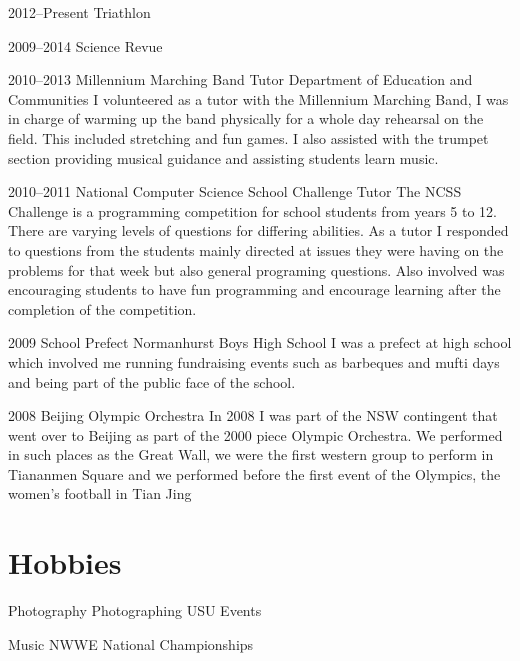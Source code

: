 \documentclass[]{friggeri-cv} %
\begin{document}
\begin{entrylist}


\entry
{2012--Present}
{Triathlon}
{}
{
}

\entry
{2009--2014}
{Science Revue}
{}
{
}

\entry
{2010--2013}
{Millennium Marching Band Tutor}
{Department of Education and Communities}
{I volunteered as a tutor with the Millennium Marching Band, I was in charge of warming up the band physically for a whole day rehearsal on the field. This included stretching and fun games. I also assisted with the trumpet section providing musical guidance and assisting students learn music.}

\entry
{2010--2011}
{National Computer Science School Challenge Tutor}
{}
{The NCSS Challenge is a programming competition for school students from years 5 to 12. There are varying levels of questions for differing abilities. As a tutor I responded to questions from the students mainly directed at issues they were having on the problems for that week but also general programing questions. Also involved was encouraging students to have fun programming and encourage learning after the completion of the competition.}

\entry
{2009}
{School Prefect}
{Normanhurst Boys High School}
{I was a prefect at high school which involved me running fundraising events such as barbeques and mufti days and being part of the public face of the school.}

\entry
{2008}
{Beijing Olympic Orchestra}
{}
{In 2008 I was part of the NSW contingent that went over to Beijing as part of the 2000 piece Olympic Orchestra. We performed in such places as the Great Wall, we were the first western group to perform in Tiananmen Square and we performed before the first event of the Olympics, the women's football in Tian Jing}


\end{entrylist}


\section{Hobbies}

\begin{entrylist}

\entry
{}
{Photography}
{}
{Photographing USU Events}

\entry
{}
{Music}
{}
{NWWE National Championships}

\end{entrylist}

\end{document}
